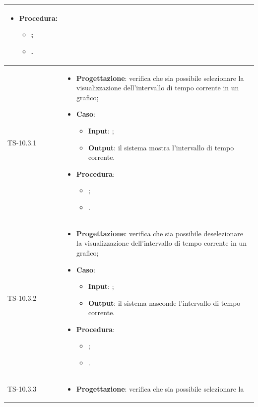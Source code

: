 \begin{longtable}{|C{2.5cm}|C{13cm}|}
\begin{itemize}
\begin{itemize}
	\end{itemize}
	\item \textbf{Procedura}:
	\begin{itemize}
		\item ;
		\item .
	\end{itemize} 
\end{itemize}
	\\
	\hline
	{TS-10.3.1} &
\begin{itemize}
	\item \textbf{Progettazione}: verifica che sia  possibile selezionare la
	visualizzazione dell'intervallo di tempo corrente in un grafico;
	\item \textbf{Caso}: 
	\begin{itemize}
		\item \textbf{Input}: ;
		\item \textbf{Output}: il sistema mostra l'intervallo di tempo corrente.
	\end{itemize}
	\item \textbf{Procedura}:
	\begin{itemize}
		\item ;
		\item .
	\end{itemize} 
\end{itemize}
	  \\
	\hline
	{TS-10.3.2} &
\begin{itemize}
	\item \textbf{Progettazione}: verifica che sia possibile deselezionare la
	visualizzazione dell'intervallo di tempo corrente in un grafico;
	\item \textbf{Caso}: 
	\begin{itemize}
		\item \textbf{Input}: ;
		\item \textbf{Output}: il sistema nasconde l'intervallo di tempo corrente.
	\end{itemize}
	\item \textbf{Procedura}:
	\begin{itemize}
		\item ;
		\item .
	\end{itemize} 
\end{itemize}
	 \\
	\hline
	{TS-10.3.3} &
\begin{itemize}
	\item \textbf{Progettazione}: verifica che sia possibile selezionare la

\end{itemize}
\end{longtable}

